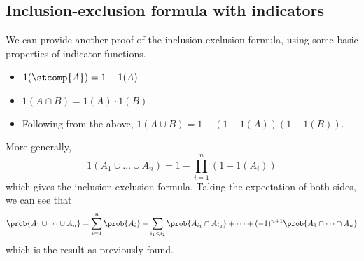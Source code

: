 \subsection{Inclusion-exclusion formula with indicators}
We can provide another proof of the inclusion-exclusion formula, using some basic properties of indicator functions.
\begin{itemize}
	\item \(1(\stcomp{A}) = 1 - 1(A)\)
	\item \(1(A \cap B) = 1(A) \cdot 1(B)\)
	\item Following from the above, \(1(A \cup B) = 1-(1-1(A))(1-1(B))\).
\end{itemize}
More generally,
\[
	1(A_1 \cup \dots \cup A_n) = 1-\prod_{i=1}^n(1-1(A_i))
\]
which gives the inclusion-exclusion formula.
Taking the expectation of both sides, we can see that
\[
	\prob{A_1 \cup \dots \cup A_n} = \sum_{i=1}^n \prob{A_i} - \sum_{i_1 < i_2} \prob{A_{i_1} \cap A_{i_2}} + \dots + (-1)^{n+1}\prob{A_1 \cap \dots \cap A_n}
\]
which is the result as previously found.

